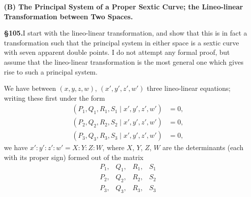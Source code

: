 \documentclass[11pt,a4paper]{article}
\begin{document}
\textbf{(B) The Principal System of a Proper Sextic Curve; the Lineo-linear Transformation between Two Spaces.}

\textbf{\S 105.}\quad I start with the lineo-linear transformation, and show that this is in fact a transformation such that the principal system in either space is a sextic curve with seven apparent double points. I do not attempt any formal proof, but assume that the lineo-linear transformation is the most general one which gives rise to such a principal system.

We have between $(x, y, z, w)$, $(x', y', z', w')$ three lineo-linear equations; writing these first under the form
\begin{align*}
(P_1, Q_1, R_1, S_1 \mid x', y', z', w') &= 0, \\
(P_2, Q_2, R_2, S_2 \mid x', y', z', w') &= 0, \\
(P_3, Q_3, R_3, S_3 \mid x', y', z', w') &= 0,
\end{align*}
we have $x' : y' : z' : w' = X : Y : Z : W$, where $X$, $Y$, $Z$, $W$ are the determinants (each with its proper sign) formed out of the matrix
\[
\begin{matrix}
P_1, & Q_1, & R_1, & S_1 \\
P_2, & Q_2, & R_2, & S_2 \\
P_3, & Q_3, & R_3, & S_3
\end{matrix}
\]
\end{document}
